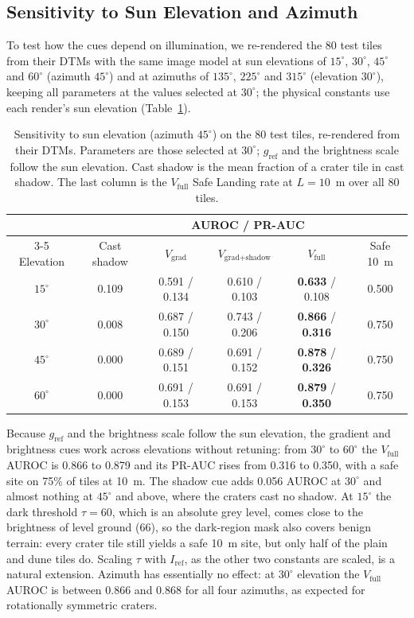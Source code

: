 \documentclass{article}
\begin{document}
\subsection{Sensitivity to Sun Elevation and Azimuth}
\label{sec:sun}
To test how the cues depend on illumination, we re-rendered the 80 test tiles from their DTMs with the same image model at sun elevations of $15^\circ$, $30^\circ$, $45^\circ$ and $60^\circ$ (azimuth $45^\circ$) and at azimuths of $135^\circ$, $225^\circ$ and $315^\circ$ (elevation $30^\circ$), keeping all parameters at the values selected at $30^\circ$; the physical constants use each render's sun elevation (Table~\ref{tab:sun}).

\begin{table}[!htb]
  \caption{Sensitivity to sun elevation (azimuth $45^\circ$) on the 80 test tiles, re-rendered from their DTMs. Parameters are those selected at $30^\circ$; $g_{\text{ref}}$ and the brightness scale follow the sun elevation. Cast shadow is the mean fraction of a crater tile in cast shadow. The last column is the $V_{\text{full}}$ Safe Landing rate at $L = 10$~m over all 80 tiles.}
  \label{tab:sun}
  \centering
  \small
  \setlength{\tabcolsep}{5pt}
  \begin{tabular}{cc ccc c}
    \toprule
    & & \multicolumn{3}{c}{AUROC / PR-AUC} & \\
    \cmidrule(lr){3-5}
    Elevation & Cast shadow & $V_{\text{grad}}$ & $V_{\text{grad+shadow}}$ & $V_{\text{full}}$ & Safe 10~m \\
    \midrule
    $15^\circ$ & 0.109 & 0.591 / 0.134 & 0.610 / 0.103 & \textbf{0.633} / 0.108 & 0.500 \\
    $30^\circ$ & 0.008 & 0.687 / 0.150 & 0.743 / 0.206 & \textbf{0.866} / \textbf{0.316} & 0.750 \\
    $45^\circ$ & 0.000 & 0.689 / 0.151 & 0.691 / 0.152 & \textbf{0.878} / \textbf{0.326} & 0.750 \\
    $60^\circ$ & 0.000 & 0.691 / 0.153 & 0.691 / 0.153 & \textbf{0.879} / \textbf{0.350} & 0.750 \\
    \bottomrule
  \end{tabular}
\end{table}

Because $g_{\text{ref}}$ and the brightness scale follow the sun elevation, the gradient and brightness cues work across elevations without retuning: from $30^\circ$ to $60^\circ$ the $V_{\text{full}}$ AUROC is 0.866 to 0.879 and its PR-AUC rises from 0.316 to 0.350, with a safe site on 75\% of tiles at 10~m. The shadow cue adds 0.056 AUROC at $30^\circ$ and almost nothing at $45^\circ$ and above, where the craters cast no shadow. At $15^\circ$ the dark threshold $\tau = 60$, which is an absolute grey level, comes close to the brightness of level ground (66), so the dark-region mask also covers benign terrain: every crater tile still yields a safe 10~m site, but only half of the plain and dune tiles do. Scaling $\tau$ with $I_{\text{ref}}$, as the other two constants are scaled, is a natural extension. Azimuth has essentially no effect: at $30^\circ$ elevation the $V_{\text{full}}$ AUROC is between 0.866 and 0.868 for all four azimuths, as expected for rotationally symmetric craters.
\end{document}
